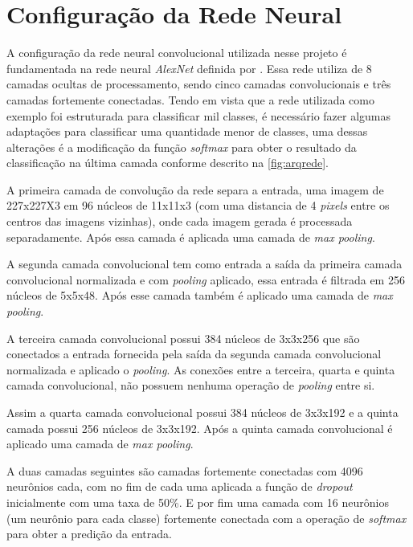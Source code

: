 


\section{Configuração da Rede Neural}

A configuração da rede neural convolucional utilizada nesse projeto é fundamentada na rede neural \textit{AlexNet} definida por . Essa rede utiliza de 8 camadas ocultas de processamento, sendo cinco camadas convolucionais e três camadas fortemente conectadas. Tendo em vista que a rede utilizada como exemplo foi estruturada para classificar mil classes, é necessário fazer algumas adaptações para classificar uma quantidade menor de classes, uma dessas alterações é a modificação da função \textit{softmax} para obter o resultado da classificação na última camada conforme descrito na \autoref{fig:arqrede}.

\par A primeira camada de convolução da rede separa a entrada, uma imagem de 227x227X3 em 96 núcleos de 11x11x3 (com uma distancia de 4 \textit{pixels} entre os centros das imagens vizinhas), onde cada imagem gerada é processada separadamente. Após essa camada é aplicada uma camada de \textit{max pooling}.

\par A segunda camada convolucional tem como entrada a saída da primeira camada convolucional normalizada e com \textit{pooling} aplicado, essa entrada é filtrada em 256 núcleos de 5x5x48. Após esse camada também é aplicado uma camada de \textit{max pooling}.

\par A terceira camada convolucional possui 384 núcleos de 3x3x256 que são conectados a entrada fornecida pela saída da segunda camada convolucional normalizada e aplicado o \textit{pooling}. As conexões entre a terceira, quarta e quinta camada convolucional, não possuem nenhuma operação de \textit{pooling} entre si. 
\par Assim a quarta camada convolucional possui 384 núcleos de 3x3x192 e a quinta camada possui 256 núcleos de 3x3x192. Após a quinta camada convolucional é aplicado uma camada de \textit{max pooling}.
\par A duas camadas seguintes são camadas fortemente conectadas com 4096 neurônios cada, com no fim de cada uma aplicada a função de \textit{dropout} inicialmente com uma taxa de 50\%. E por fim uma camada com 16 neurônios (um neurônio para cada classe) fortemente conectada com a operação de \textit{softmax} para obter a predição da entrada.

